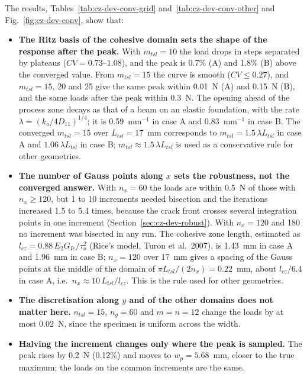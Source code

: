 The results, Tables~\ref{tab:cz-dev-conv-grid} and~\ref{tab:cz-dev-conv-other} and Fig.~\ref{fig:cz-dev-conv}, show that:

\begin{itemize}
	\item \textbf{The Ritz basis of the cohesive domain sets the shape of the response after the peak.} With $m_{tsl} = 10$ the load drops in steps separated by plateaus ($CV = 0.73$--$1.08$), and the peak is 0.7\% (A) and 1.8\% (B) above the converged value. From $m_{tsl} = 15$ the curve is smooth ($CV \leq 0.27$), and $m_{tsl} = 15$, 20 and 25 give the same peak within 0.01~N (A) and 0.15~N (B), and the same loads after the peak within 0.3~N. The opening ahead of the process zone decays as that of a beam on an elastic foundation, with the rate $\lambda = (k_o/4D_{11})^{1/4}$; it is 0.59~mm$^{-1}$ in case A and 0.83~mm$^{-1}$ in case B. The converged $m_{tsl} = 15$ over $L_{tsl} = 17$~mm corresponds to $m_{tsl} = 1.5\,\lambda L_{tsl}$ in case A and $1.06\,\lambda L_{tsl}$ in case B; $m_{tsl} \approx 1.5\,\lambda L_{tsl}$ is used as a conservative rule for other geometries.
	\item \textbf{The number of Gauss points along $x$ sets the robustness, not the converged answer.} With $n_x = 60$ the loads are within 0.5~N of those with $n_x \geq 120$, but 1 to 10 increments needed bisection and the iterations increased 1.5 to 5.4 times, because the crack front crosses several integration points in one increment (Section~\ref{sec:cz-dev-robust}). With $n_x = 120$ and 180 no increment was bisected in any run. The cohesive zone length, estimated as $l_{cz} = 0.88\,E_2 G_{Ic}/\tau_o^2$ (Rice's model, Turon et al.\ 2007), is 1.43~mm in case A and 1.96~mm in case B; $n_x = 120$ over 17~mm gives a spacing of the Gauss points at the middle of the domain of $\pi L_{tsl}/(2 n_x) = 0.22$~mm, about $l_{cz}/6.4$ in case A, i.e.\ $n_x \approx 10\,L_{tsl}/l_{cz}$. This is the rule used for other geometries.
	\item \textbf{The discretisation along $y$ and of the other domains does not matter here.} $n_{tsl} = 15$, $n_y = 60$ and $m = n = 12$ change the loads by at most 0.02~N, since the specimen is uniform across the width.
	\item \textbf{Halving the increment changes only where the peak is sampled.} The peak rises by 0.2~N (0.12\%) and moves to $w_p = 5.68$~mm, closer to the true maximum; the loads on the common increments are the same.
\end{itemize}

